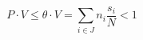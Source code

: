 \begin{equation}
P \cdot V  \le \theta \cdot V = \sum_{i\in J} n_i \frac{s_i}{N} < 1
\end{equation}

